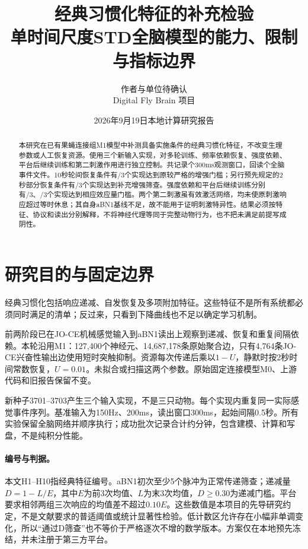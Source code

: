 \documentclass[UTF8,a4paper,zihao=-4,fontset=none]{ctexart}
\title{\bfseries 经典习惯化特征的补充检验\\\large 单时间尺度STD全脑模型的能力、限制与指标边界}
\author{作者与单位待确认\\\small Digital Fly Brain 项目}
\date{2026年9月19日\quad 本地计算研究报告}
\begin{document}
\maketitle
\begin{abstract}
本研究在已有果蝇连接组M1模型中补测具备实施条件的经典习惯化特征，不改变生理参数或人工恢复资源。使用三个新输入实现，对多轮训练、频率依赖恢复、强度依赖、平台后继续训练和第二刺激作用进行独立控制。共记录\Windows{}个300ms观测窗口，回读\EventFiles{}个全脑事件文件。10秒轮间恢复条件有\FullPass/3个实现达到原较严格的增强门槛；另行预先规定的2秒部分恢复条件有\PartialPass/3个实现达到补充增强筛查。强度依赖和平台后继续训练分别有\StrengthPass/3、\AccumulationPass/3个实现达到相应效应量门槛。两个第二刺激虽有效激活网络，均未使原刺激响应超过等时休息；其自身aBN1基线不足，故不能用于证明刺激特异性。结果必须按特征、协议和读出分别解释，不将神经代理等同于完整动物行为，也不把未满足前提写成阴性。
\end{abstract}

\section{研究目的与固定边界}
经典习惯化包括响应递减、自发恢复及多项附加特征\citep{rankin2009}。这些特征不是所有系统都必须同时满足的清单；反过来，只看到下降曲线也不足以确定学习机制。

前两阶段已在JO-CE机械感觉输入到aBN1读出上观察到递减、恢复和重复间隔依赖。本轮沿用M1：127,400个神经元、14,687,178条原始聚合边，只有4,764条JO-CE兴奋性输出边使用短时突触抑制。资源每次传递后乘以$1-U$，静默时按2秒时间常数恢复，$U=0.01$。未拟合或扫描这两个参数。原始固定连接模型M0、上游代码和旧报告保留不变。

新种子3701--3703产生三个输入实现，不是三只动物。每个实现内重复同一实际感觉事件序列。基准输入为150Hz、200ms，读出窗口300ms，起始间隔0.5秒。所有实验保留全脑网络并顺序执行；成功批次记录合计约\WallMinutes{}分钟，包含建模、计算和写盘，不是纯积分性能。

\paragraph{编号与判据。}
本文H1--H10指经典特征编号。aBN1初次至少5个脉冲为正常传递筛查；递减量$D=1-L/E$，其中$E$为前3次均值、$L$为末3次均值，$D\geq0.30$为递减门槛。平台要求相邻两组三次响应的均值差不超过$0.10E$。这些数值是本项目的先导研究约定，不是文献要求的普适阈值或统计显著性检验。低计数区允许存在小幅非单调变化，所以“通过D筛查”也不等价于严格逐次不增的数学版本。方案仅在本地预先冻结，并未注册于第三方平台。
\end{document}
